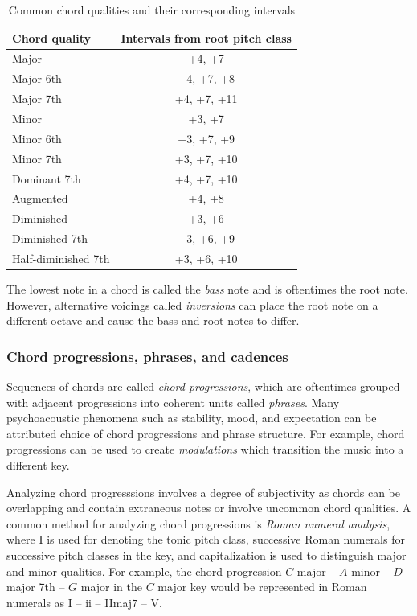 \begin{table}[tb]
    \centering
    \caption{Common chord qualities and their corresponding intervals \citep{freedman2015correlational}}
    \label{tab:chord-qualities}
    \begin{tabular}{lc}
        \toprule
        Chord quality & Intervals from root pitch class \\
        \midrule
        Major & +4, +7 \\
        Major 6th & +4, +7, +8 \\
        Major 7th & +4, +7, +11 \\
        Minor & +3, +7 \\
        Minor 6th & +3, +7, +9 \\
        Minor 7th & +3, +7, +10 \\
        Dominant 7th & +4, +7, +10 \\
        Augmented & +4, +8 \\
        Diminished & +3, +6 \\
        Diminished 7th & +3, +6, +9 \\
        Half-diminished 7th & +3, +6, +10 \\
        \bottomrule
    \end{tabular}
\end{table}

The lowest note in a chord is called the \emph{bass} note and is oftentimes the
root note. However, alternative voicings called \emph{inversions} can place the
root note on a different octave and cause the bass and root notes to
differ.

\subsubsection{Chord progressions, phrases, and cadences}

Sequences of chords are called \emph{chord progressions}, which are oftentimes
grouped with adjacent progressions into coherent units called \emph{phrases}.
Many psychoacoustic phenomena such as stability, mood, and expectation can be
attributed choice of chord progressions and phrase structure. For example,
chord progressions can be used to create \emph{modulations} which transition
the music into a different key.

Analyzing chord progresssions involves a degree of subjectivity as chords can
be overlapping and contain extraneous notes or involve uncommon chord
qualities. A common method for analyzing chord progressions is \emph{Roman
numeral analysis}, where \RN{1} is used for denoting the tonic pitch class,
successive Roman numerals for successive pitch classes in the key, and
capitalization is used to distinguish major and minor qualities. For example,
the chord progression $C$ major -- $A$ minor -- $D$ major 7th -- $G$ major in
the $C$ major key would be represented in Roman numerals as \RN{1} -- \Rn{2} --
\RN{2}maj$7$ -- \RN{5}.

